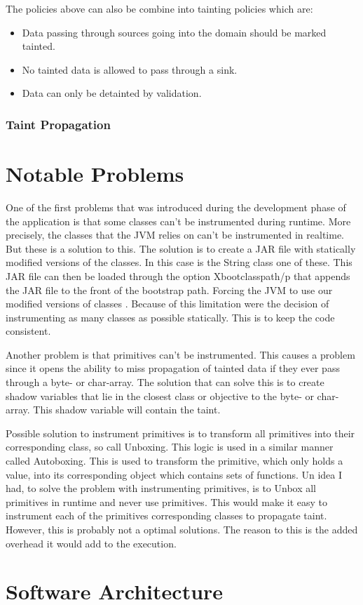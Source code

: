 The policies above can also be combine into tainting policies which are:

\hfill
\begin{itemize}
	\item Data passing through sources going into the domain should be marked tainted.
	\item No tainted data is allowed to pass through a sink.
	\item Data can only be detainted by validation.
\end{itemize}
\hfill


\subsubsection{Taint Propagation}



\section{Notable Problems}
\label{NotableProblems}
One of the first problems that was introduced during the development phase of the application is that some classes can't be instrumented during runtime. More precisely, the classes that the JVM relies on can't be instrumented in realtime. But these is a solution to this. The solution is to create a JAR file with statically modified versions of the classes. In this case is the String class one of these. This JAR file can then be loaded through the option Xbootclasspath/p that appends the JAR file to the front of the bootstrap path. Forcing the JVM to use our modified versions of classes \parencite{xboot}. Because of this limitation were the decision of instrumenting as many classes as possible statically. This is to keep the code consistent.

Another problem is that primitives can't be instrumented. This causes a problem since it opens the ability to miss propagation of tainted data if they ever pass through a byte- or char-array. The solution that can solve this is to create shadow variables that lie in the closest class or objective to the byte- or char-array. This shadow variable will contain the taint.

Possible solution to instrument primitives is to transform all primitives into their corresponding class, so call Unboxing. This logic is used in a similar manner called Autoboxing. This is used to transform the primitive, which only holds a value, into its corresponding object which contains sets of functions. Un idea I had, to solve the problem with instrumenting primitives, is to Unbox all primitives in runtime and never use primitives. This would make it easy to instrument each of the primitives corresponding classes to propagate taint. However, this is probably not a optimal solutions. The reason to this is the added overhead it would add to the execution. \parencite{BlochJoshua2008EJ}

\section{Software Architecture}
\label{SoftwareArchitecture}

